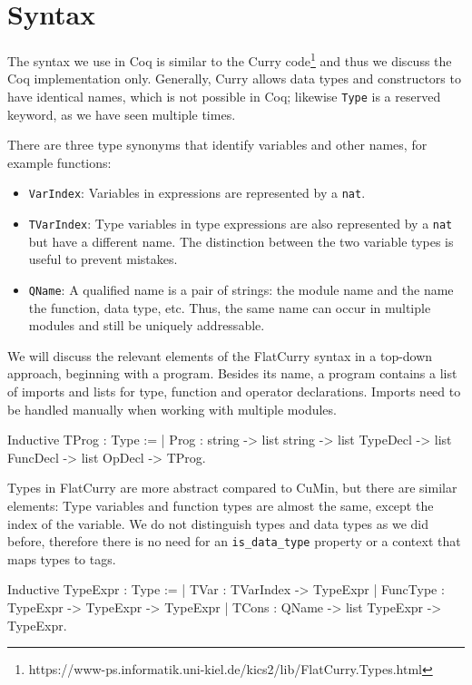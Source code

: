 \documentclass[paper = a4, fleqn, abstract=on, twoside]{scrreprt}
\newcommand{\todo}[1]{\marginpar{\textbf{TODO:} #1}}
\newcommand{\coqinline}[1]{\texttt{#1}}
\begin{document}
\section{Syntax}
\label{flatcurrysyntax}
The syntax we use in Coq is similar to the Curry code\footnote{https://www-ps.informatik.uni-kiel.de/kics2/lib/FlatCurry.Types.html} and thus we discuss the Coq implementation only. Generally, Curry allows data types and constructors to have identical names, which is not possible in Coq; likewise \texttt{Type} is a reserved keyword, as we have seen multiple times.
\par
There are three type synonyms that identify variables and other names, for example functions:
\begin{itemize}
	\item \coqinline{VarIndex}: Variables in expressions are represented by a \coqinline{nat}.
	\item \coqinline{TVarIndex}: Type variables in type expressions are also represented by a \coqinline{nat} but have a different name. The distinction between the two variable types is useful to prevent mistakes.
	\item \coqinline{QName}: A qualified name is a pair of strings: the module name and the name the function, data type, etc. Thus, the same name can occur in multiple modules and still be uniquely addressable.
\end{itemize}
We will discuss the relevant elements of the FlatCurry syntax in a top-down approach, beginning with a program. Besides its name, a program contains a list of imports and lists for type, function and operator declarations. Imports need to be handled manually when working with multiple modules. \todo{Verlinkung praktische Nutzung}
\begin{coqcode}
Inductive TProg : Type := 
| Prog : string -> list string ->
         list TypeDecl -> list FuncDecl -> list OpDecl -> TProg.
\end{coqcode}
Types in FlatCurry are more abstract compared to CuMin, but there are similar elements: Type variables and function types are almost the same, except the index of the variable. We do not distinguish types and data types as we did before, therefore there is no need for an \texttt{is\_data\_type} property or a context that maps types to tags.
\begin{coqcode}
Inductive TypeExpr : Type :=
  | TVar     : TVarIndex -> TypeExpr
  | FuncType : TypeExpr  -> TypeExpr      -> TypeExpr
  | TCons    : QName     -> list TypeExpr -> TypeExpr.
\end{coqcode}
\end{document}
